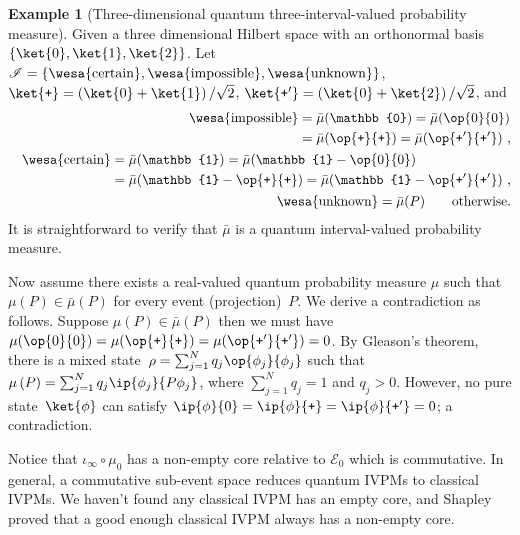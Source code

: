 \documentclass[english,reprint, aps, prl,superscriptaddress, showpacs,
showkeys, longbibliography, amsmath, amssymb]{revtex4-1}
\theoremstyle{plain}
\theoremstyle{definition}
\newtheorem{example}[thm]{Example}
\newcommand{\events}{\ensuremath{\mathcal{E}}}
\newcommand{\imposs}{{\text{\wesa{impossible}}}}
\newcommand{\necess}{{\text{\wesa{certain}}}}
\newcommand{\unknown}{{\text{\wesa{unknown}}}}
\newcommand{\proj}[1]{\op{#1}{#1}}
\newcommand{\ps}{\texttt{+}}
\begin{document}
\begin{example}[Three-dimensional quantum three-interval-valued probability
measure]\label{ex:three-dimensional-three-value} Given a three dimensional
Hilbert space with an orthonormal basis $\left\{ \ket{0},\ket{1},\ket{2}\right\} $.
Let $\mathscr{I}=\left\{ \necess,\imposs,\unknown\right\} $, $\ket{\ps}=\left(\ket{0}+\ket{1}\right)/\sqrt{2}$,
$\ket{\ps'}=\left(\ket{0}+\ket{2}\right)/\sqrt{2}$, and
\begin{eqnarray}
 &  & \begin{split}\imposs & =\bar{\mu}(\mathbb{0})=\bar{\mu}(\proj{0})\\
 & =\bar{\mu}(\proj{\ps})=\bar{\mu}(\proj{\ps'})\textrm{ ,}
\end{split}
\\
 &  & \begin{split}\necess & =\bar{\mu}(\mathbb{1})=\bar{\mu}(\mathbb{1}-\proj{0})\\
 & =\bar{\mu}(\mathbb{1}-\proj{\ps})=\bar{\mu}(\mathbb{1}-\proj{\ps'})\textrm{ ,}
\end{split}
\\
 &  & \unknown=\bar{\mu}(P)\qquad\textrm{otherwise.}
\end{eqnarray}
It is straightforward to verify that $\bar{\mu}$ is a quantum interval-valued
probability measure. 

\newpage{}

Now assume there exists a real-valued quantum probability measure
$\mu$ such that $\mu(P)\in\bar{\mu}(P)$ for every event (projection)~$P$.
We derive a contradiction as follows. Suppose $\mu(P)\in\bar{\mu}(P)$
then we must have $\mu(\proj{0})=\mu(\proj{\ps})=\mu(\proj{\ps'})=0$.
By Gleason's theorem, there is a mixed state~$\rho=\sum_{j=1}^{N}q_{j}\proj{\phi_{j}}$
such that $\mu\left(P\right)=\sum_{j=1}^{N}q_{j}\ip{\phi_{j}}{P\phi_{j}}$,
where $\sum_{j=1}^{N}q_{j}=1$ and $q_{j}>0$. However, no pure state~$\ket{\phi}$
can satisfy $\ip{\phi}{0}=\ip{\phi}{\ps}=\ip{\phi}{\ps'}=0$; a contradiction.
\end{example}

\newpage{}

Notice that $\iota_{\infty}\circ\mu_{0}$ has a non-empty
core relative to $\events_{0}$ which is commutative. In general,
a commutative sub-event space reduces quantum IVPMs to classical IVPMs.
We haven't found any classical IVPM has an empty core, and Shapley
proved that a good enough classical IVPM always has a non-empty core.
\end{document}
